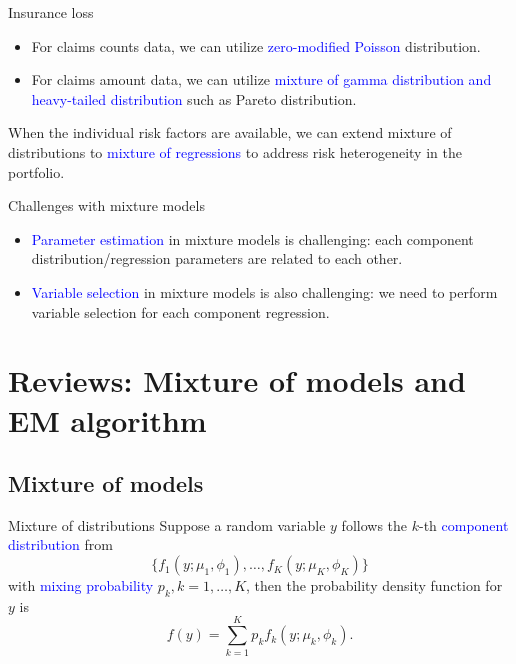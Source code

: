 \documentclass[professionalfont]{beamer}
\newcommand{\blue}[1]{\textcolor{blue}{#1}}
\begin{document}
\begin{frame}{Insurance loss}

	\begin{itemize}
		\item For claims counts data, we can utilize \blue{zero-modified Poisson} distribution.
		\item For claims amount data, we can utilize \blue{mixture of gamma distribution and heavy-tailed distribution} such as Pareto distribution.
	\end{itemize}
	When the individual risk factors are available, we can extend mixture of distributions to \blue{mixture of regressions} to address  risk heterogeneity in the portfolio.
\end{frame}

\begin{frame}{Challenges with mixture models}



	\begin{itemize}
		\item \blue{Parameter estimation} in mixture models is challenging: each {component distribution/regression} parameters are related to each other.
		\item \blue{Variable selection} in mixture models is also challenging:
		we need to perform variable selection for each component regression.
	\end{itemize}
	\end{frame}



 \section{Reviews: Mixture of models and EM algorithm}
 \subsection{Mixture of models}

 \begin{frame}{Mixture of distributions}
Suppose a random variable $y$ follows the $k$-th \blue{component distribution} from
$$\{f_1(y;\mu_1,\phi_1),\ldots,f_K(y;\mu_K,\phi_K)\}$$
with \blue{mixing probability} $p_k, k=1,\ldots,K$,
then the probability density function for $y$ is
$$f(y)=\sum_{k=1}^Kp_kf_k(y;\mu_k,\phi_k).$$
\end{frame}
\end{document}
